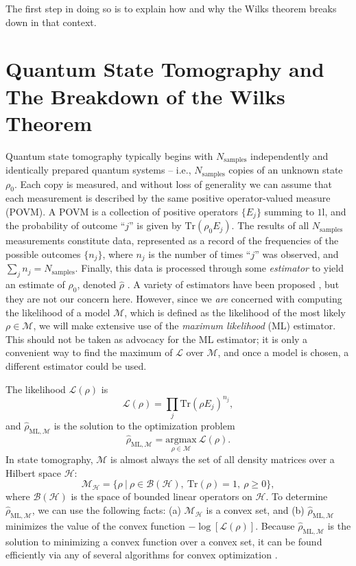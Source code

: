 \documentclass[aps,pra, twocolumn]{revtex4-1}
\newcommand{\M}{\mathcal{M}}
\newcommand{\Tr}{\mathrm{Tr}}
\newcommand{\cH}{\mathcal{H}}
\newcommand{\cL}{\mathcal{L}}
\newcommand{\Id}{\mathbb{I}}
\def\Id{1\!\mathrm{l}}
\newcommand{\rhohat}{\hat{\rho}}
\newcommand{\rhoML}[1]{\rhohat_{\scriptscriptstyle{\mathrm{ML},#1}}}
\begin{document}
The first step in doing so is to explain how and why the Wilks theorem breaks down in that context.

\section{Quantum State Tomography and The Breakdown of the Wilks Theorem}
\label{sec:qstmodelselection}
Quantum state tomography typically begins with $N_{\mathrm{samples}}$ independently and identically prepared quantum systems -- i.e., $N_{\mathrm{samples}}$ copies of an unknown state $\rho_{0}$.  Each copy is measured, and without loss of generality we can assume that each measurement is described by the same positive operator-valued measure (POVM).  A POVM is a collection of positive operators $\{E_j\}$ summing to $\Id$, and the probability of outcome ``$j$'' is given by $\Tr(\rho_0 E_j)$.  The results of all $N_{\mathrm{samples}}$ measurements constitute data, represented as a record of the frequencies of the possible outcomes $\{n_{j}\}$, where $n_{j}$ is the number of times ``$j$'' was observed, and $\sum_{j}n_{j} = N_{\mathrm{samples}}$.  Finally, this data is processed through some \emph{estimator} to yield an estimate of $\rho_0$, denoted $\hat{\rho}$ .  A variety of estimators have been proposed \cite{Vogel1989,Hradil1997,JamesPRA2001,Blume-Kohout2010b,Blume-Kohout2010,Zhu2014a,Ferrie2016}, but they are not our concern here.  However, since we \emph{are} concerned with computing the likelihood of a model $\M$, which is defined as the likelihood of the most likely $\rho\in\M$, we will make extensive use of the \emph{maximum likelihood} (ML) estimator.  This should not be taken as advocacy for the ML estimator; it is only a convenient way to find the maximum of $\cL$ over $\M$, and once a model is chosen, a different estimator could be used.

The likelihood $\mathcal{L}(\rho)$ is
\begin{equation}
\nonumber \mathcal{L}(\rho) = \prod_{j}\mathrm{Tr}(\rho E_{j})^{n_{j}},
\end{equation}
and $\rhoML{\M}$ is the solution to the optimization problem
\begin{equation}
\nonumber \rhoML{\M} = \underset{\rho \in \M}{\text{argmax}}~\mathcal{L}(\rho).
\end{equation}
In state tomography, $\M$ is almost always the set of all density matrices over a Hilbert space $\cH$:
\begin{equation}
\nonumber \mathcal{M}_{\cH} = \{\rho~|~\rho \in \mathcal{B}(\mathcal{H}),~\mathrm{Tr}(\rho) =1,~\rho \geq 0\},
\end{equation}
where $\mathcal{B}(\cH)$ is the space of bounded linear operators on $\cH$.  To determine $\rhoML{\M}$, we can use the following facts: (a) $\M_{\cH}$ is a convex set, and (b) $\rhoML{\M}$ minimizes the value of the convex function $-\log[\mathcal{L}(\rho)]$. Because $\rhoML{\M}$ is the solution to minimizing a convex function  over a convex set, it can be found efficiently via any of several algorithms for convex optimization \cite{Boyd}.
\end{document}
